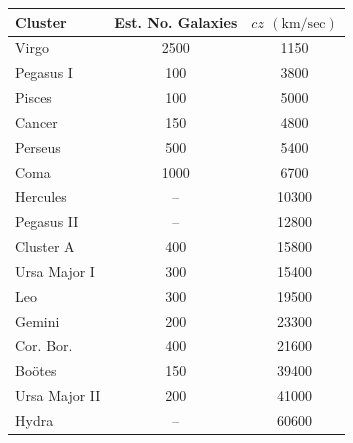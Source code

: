 \begin{center}
\begin{tabular}{@{}lcc@{}}
\toprule
Cluster & Est. No. Galaxies & \(cz\) \((\mathrm{km/sec})\)\\
\midrule
Virgo         & 2500 & 1150\\
Pegasus I     & 100  & 3800\\
Pisces        & 100  & 5000\\
Cancer        & 150  & 4800\\
Perseus       & 500  & 5400\\
Coma          & 1000 & 6700\\
Hercules      & --   & 10300\\
Pegasus II    & --   & 12800\\
Cluster A     & 400  & 15800\\
Ursa Major I  & 300  & 15400\\
Leo           & 300  & 19500\\
Gemini        & 200  & 23300\\
Cor. Bor.     & 400  & 21600\\
Bo\"otes       & 150  & 39400\\
Ursa Major II & 200  & 41000\\
Hydra         & --   & 60600\\
\bottomrule
\end{tabular}
\end{center}
\endgroup
